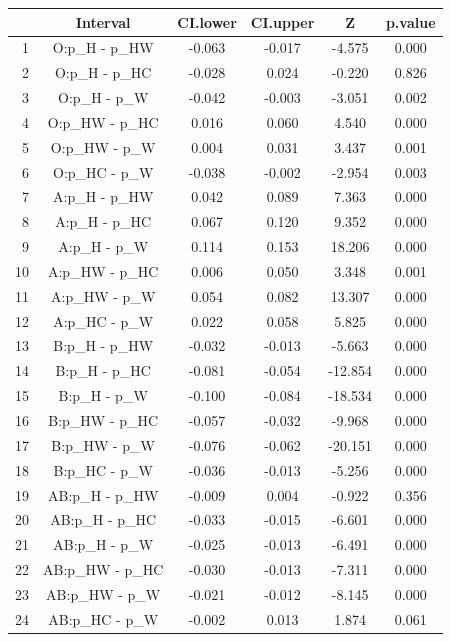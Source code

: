 \documentclass{article}\usepackage[]{graphicx}\usepackage[]{color}
\begin{document}
\begin{table}[ht]
\centering
\begin{tabular}{r|c|cccc}
  \hline
 & Interval & CI.lower & CI.upper & Z & p.value \\ 
  \hline
1 & O:p\_H - p\_HW & -0.063 & -0.017 & -4.575 & 0.000 \\ 
  2 & O:p\_H - p\_HC & -0.028 & 0.024 & -0.220 & 0.826 \\ 
  3 & O:p\_H - p\_W & -0.042 & -0.003 & -3.051 & 0.002 \\ 
  4 & O:p\_HW - p\_HC & 0.016 & 0.060 & 4.540 & 0.000 \\ 
  5 & O:p\_HW - p\_W & 0.004 & 0.031 & 3.437 & 0.001 \\ 
  6 & O:p\_HC - p\_W & -0.038 & -0.002 & -2.954 & 0.003 \\ 
  7 & A:p\_H - p\_HW & 0.042 & 0.089 & 7.363 & 0.000 \\ 
  8 & A:p\_H - p\_HC & 0.067 & 0.120 & 9.352 & 0.000 \\ 
  9 & A:p\_H - p\_W & 0.114 & 0.153 & 18.206 & 0.000 \\ 
  10 & A:p\_HW - p\_HC & 0.006 & 0.050 & 3.348 & 0.001 \\ 
  11 & A:p\_HW - p\_W & 0.054 & 0.082 & 13.307 & 0.000 \\ 
  12 & A:p\_HC - p\_W & 0.022 & 0.058 & 5.825 & 0.000 \\ 
  13 & B:p\_H - p\_HW & -0.032 & -0.013 & -5.663 & 0.000 \\ 
  14 & B:p\_H - p\_HC & -0.081 & -0.054 & -12.854 & 0.000 \\ 
  15 & B:p\_H - p\_W & -0.100 & -0.084 & -18.534 & 0.000 \\ 
  16 & B:p\_HW - p\_HC & -0.057 & -0.032 & -9.968 & 0.000 \\ 
  17 & B:p\_HW - p\_W & -0.076 & -0.062 & -20.151 & 0.000 \\ 
  18 & B:p\_HC - p\_W & -0.036 & -0.013 & -5.256 & 0.000 \\ 
  19 & AB:p\_H - p\_HW & -0.009 & 0.004 & -0.922 & 0.356 \\ 
  20 & AB:p\_H - p\_HC & -0.033 & -0.015 & -6.601 & 0.000 \\ 
  21 & AB:p\_H - p\_W & -0.025 & -0.013 & -6.491 & 0.000 \\ 
  22 & AB:p\_HW - p\_HC & -0.030 & -0.013 & -7.311 & 0.000 \\ 
  23 & AB:p\_HW - p\_W & -0.021 & -0.012 & -8.145 & 0.000 \\ 
  24 & AB:p\_HC - p\_W & -0.002 & 0.013 & 1.874 & 0.061 \\ 
   \hline
\end{tabular}
\end{table}
\end{document}
